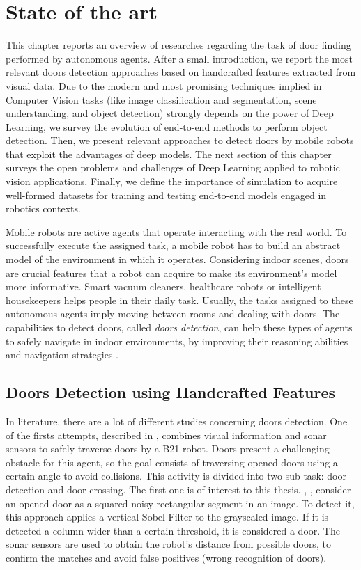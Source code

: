 \chapter{State of the art}
\label{capitolo2}
\thispagestyle{empty}

 This chapter reports an overview of researches regarding the task of door finding performed by autonomous agents. After a small introduction, we report the most relevant doors detection approaches based on handcrafted features extracted from visual data. Due to the modern and most promising techniques implied in Computer Vision tasks (like image classification and segmentation, scene understanding, and object detection) strongly depends on the power of Deep Learning, we survey the evolution of end-to-end methods to perform object detection. Then, we present relevant approaches to detect doors by mobile robots that exploit the advantages of deep models. The next section of this chapter surveys the open problems and challenges of Deep Learning applied to robotic vision applications. Finally, we define the importance of simulation to acquire well-formed datasets for training and testing end-to-end models engaged in robotics contexts.  
 
 Mobile robots are active agents that operate interacting with the real world. To successfully execute the assigned task, a mobile robot has to build an abstract model of the environment in which it operates. Considering indoor scenes, doors are crucial features that a robot can acquire to make its environment's model more informative. 
 Smart vacuum cleaners, healthcare robots or intelligent housekeepers helps people in their daily task. Usually, the tasks assigned to these autonomous agents imply moving between rooms and dealing with doors. The capabilities to detect doors, called \emph{doors detection}, can help these types of agents to safely navigate in indoor environments, by improving their reasoning abilities and navigation strategies \cite{sonarandivisualdoordetection, doorsandnavigation, humanoid}.
 
 \section{Doors Detection using Handcrafted Features}
  In literature, there are a lot of different studies concerning doors detection. One of the firsts attempts, described in \cite{sonarandivisualdoordetection}, combines visual information and sonar sensors to safely traverse doors by a B21 robot. Doors present a challenging obstacle for this agent, so the goal consists of traversing opened doors using a certain angle to avoid collisions. This activity is divided into two sub-task: door detection and door crossing. The first one is of interest to this thesis. \citeauthor{sonarandivisualdoordetection}, \cite{sonarandivisualdoordetection}, consider an opened door as a squared noisy rectangular segment in an image. To detect it, this approach applies a vertical Sobel Filter to the grayscaled image. If it is detected a column wider than a certain threshold, it is considered a door. The sonar sensors are used to obtain the robot's distance from possible doors, to confirm the matches and avoid false positives (wrong recognition of doors).
  
